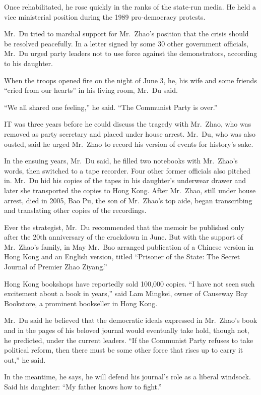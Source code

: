 ﻿\documentclass[12pt]{article}
\begin{document}
Once rehabilitated, he rose quickly in the ranks of the state-run media. He held a vice ministerial
position during the 1989 pro-democracy protests.

Mr.~Du tried to marshal support for Mr.~Zhao's position that the crisis should be resolved
peacefully. In a letter signed by some 30 other government officials, Mr.~Du urged party leaders not
to use force against the demonstrators, according to his daughter.

When the troops opened fire on the night of June 3, he, his wife and some friends ``cried from our
hearts'' in his living room, Mr.~Du said.

``We all shared one feeling,'' he said. ``The Communist Party is over.''

IT was three years before he could discuss the tragedy with Mr.~Zhao, who was removed as party
secretary and placed under house arrest. Mr.~Du, who was also ousted, said he urged Mr.~Zhao to
record his version of events for history's sake.

In the ensuing years, Mr.~Du said, he filled two notebooks with Mr.~Zhao's words, then switched to a
tape recorder. Four other former officials also pitched in. Mr.~Du hid his copies of the tapes in
his daughter's underwear drawer and later she transported the copies to Hong Kong. After Mr.~Zhao,
still under house arrest, died in 2005, Bao Pu, the son of Mr.~Zhao's top aide, began transcribing
and translating other copies of the recordings.

Ever the strategist, Mr.~Du recommended that the memoir be published only after the 20th anniversary
of the crackdown in June. But with the support of Mr.~Zhao's family, in May Mr.~Bao arranged
publication of a Chinese version in Hong Kong and an English version, titled ``Prisoner of the
State: The Secret Journal of Premier Zhao Ziyang.''

Hong Kong bookshops have reportedly sold 100,000 copies. ``I have not seen such excitement about a
book in years,'' said Lam Mingkei, owner of Causeway Bay Bookstore, a prominent bookseller in Hong
Kong.

Mr.~Du said he believed that the democratic ideals expressed in Mr.~Zhao's book and in the pages of
his beloved journal would eventually take hold, though not, he predicted, under the current leaders.
``If the Communist Party refuses to take political reform, then there must be some other force that
rises up to carry it out,'' he said.

In the meantime, he says, he will defend his journal's role as a liberal windsock. Said his
daughter: ``My father knows how to fight.''
\end{document}
